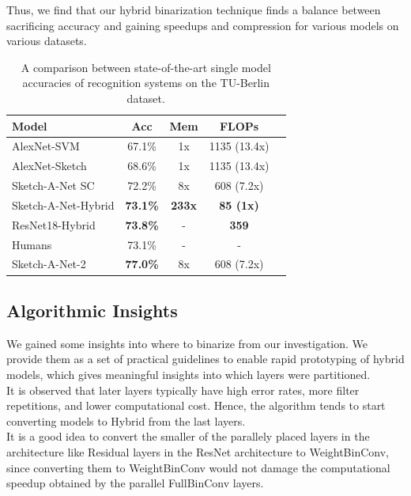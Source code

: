 Thus, we find that our hybrid binarization technique finds a balance between sacrificing accuracy and gaining speedups and compression for various models on various datasets.
\begin{table}[t]
\begin{center}
\begin{tabular}{|l|c|c|c|l|}
\hline
{\bf Model} & {\bf Acc} & {\bf Mem} & {\bf FLOPs}\\
\hline
AlexNet-SVM & 67.1\% & 1x & 1135 (13.4x)\\
AlexNet-Sketch & 68.6\% & 1x & 1135 (13.4x)\\
Sketch-A-Net SC & 72.2\% & 8x & 608 (7.2x)\\
\hline
Sketch-A-Net-Hybrid & {\bf 73.1\%} & {\bf 233x} & {\bf 85 (1x)}\\
ResNet18-Hybrid & {\bf 73.8\%} & - & {\bf 359 }\\
\hline
Humans & {73.1\%} & - & - \\
Sketch-A-Net-2  \footnotemark \cite{yu2017sketch} & {\bf 77.0\%} & 8x & 608 (7.2x)\\
\hline
\end{tabular}
\end{center}
\caption{A comparison between state-of-the-art single model accuracies of recognition systems on the TU-Berlin dataset.}
\label{table:sketchcomp}
\end{table}

\subsection{Algorithmic Insights}
\noindent We gained some insights into where to binarize from our investigation. We provide them as a set of practical guidelines to enable rapid prototyping of hybrid models, which gives meaningful insights into which layers were partitioned.\\

 It is observed that later layers typically have high error rates, more filter repetitions, and lower computational cost. Hence, the algorithm tends to start converting models to Hybrid from the last layers. \\

 It is a good idea to convert the smaller of the parallely placed layers in the architecture like Residual layers in the ResNet architecture to WeightBinConv, since converting them to WeightBinConv would not damage the computational speedup obtained by the parallel FullBinConv layers.\\

